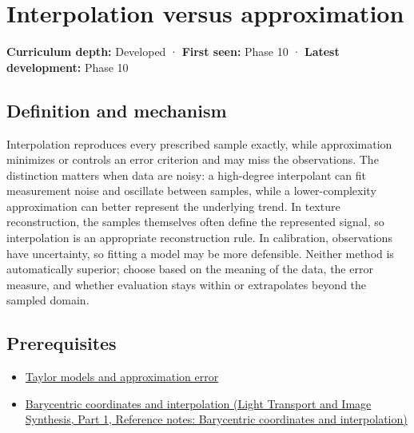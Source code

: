 \hypertarget{appendix-0c2a5f69851e}{}\label{referencestart:appendix-0c2a5f69851e}
\section{Interpolation versus approximation}\label{appendix-0c2a5f69851e-interpolation-versus-approximation}

\hypertarget{appendix-0c2a5f69851e-interpolation-versus-approximation}{}

\textbf{Curriculum depth:} Developed · \textbf{First seen:} Phase 10 · \textbf{Latest development:} Phase 10

\begin{allmightroledefinition}

\subsection{Definition and mechanism}\label{appendix-0c2a5f69851e-definition-and-mechanism}

\hypertarget{appendix-0c2a5f69851e-definition-and-mechanism}{}

Interpolation reproduces every prescribed sample exactly, while approximation minimizes or controls an error criterion and may miss the observations. The distinction matters when data are noisy: a high-degree interpolant can fit measurement noise and oscillate between samples, while a lower-complexity approximation can better represent the underlying trend. In texture reconstruction, the samples themselves often define the represented signal, so interpolation is an appropriate reconstruction rule. In calibration, observations have uncertainty, so fitting a model may be more defensible. Neither method is automatically superior; choose based on the meaning of the data, the error measure, and whether evaluation stays within or extrapolates beyond the sampled domain.

\end{allmightroledefinition}

\subsection{Prerequisites}\label{appendix-0c2a5f69851e-prerequisites}

\hypertarget{appendix-0c2a5f69851e-prerequisites}{}

\begin{itemize}
\tightlist
\item
  \hyperref[appendix-32f39e9a3738]{Taylor models and approximation error}
\item
  \href{../04-Light-Transport-and-Image-Synthesis-P01/main.pdf\#nameddest=appendix-02b9d9a81dca}{Barycentric coordinates and interpolation (Light Transport and Image Synthesis, Part 1, Reference notes: Barycentric coordinates and interpolation)}
\end{itemize}

